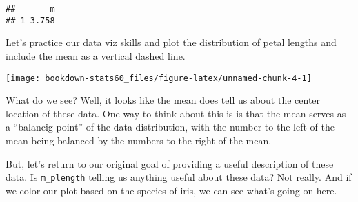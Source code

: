 \documentclass[]{book}
\newenvironment{Shaded}{\begin{snugshade}}{\end{snugshade}}
\newcommand{\KeywordTok}[1]{\textcolor[rgb]{0.13,0.29,0.53}{\textbf{{#1}}}}
\newcommand{\DataTypeTok}[1]{\textcolor[rgb]{0.13,0.29,0.53}{{#1}}}
\newcommand{\DecValTok}[1]{\textcolor[rgb]{0.00,0.00,0.81}{{#1}}}
\newcommand{\FloatTok}[1]{\textcolor[rgb]{0.00,0.00,0.81}{{#1}}}
\newcommand{\StringTok}[1]{\textcolor[rgb]{0.31,0.60,0.02}{{#1}}}
\newcommand{\NormalTok}[1]{{#1}}
\begin{document}
\begin{Shaded}
\end{Shaded}

\begin{verbatim}
##       m
## 1 3.758
\end{verbatim}

Let's practice our data viz skills and plot the distribution of petal
lengths and include the mean as a vertical dashed line.

\begin{Shaded}
\end{Shaded}

\begin{center}\texttt{[image: bookdown-stats60\_files/figure-latex/unnamed-chunk-4-1]} \end{center}

What do we see? Well, it looks like the mean does tell us about the
center location of these data. One way to think about this is is that
the mean serves as a ``balancig point'' of the data distribution, with
the number to the left of the mean being balanced by the numbers to the
right of the mean.

But, let's return to our original goal of providing a useful description
of these data. Is \texttt{m\_plength} telling us anything useful about
these data? Not really. And if we color our plot based on the species of
iris, we can see what's going on here.
\end{document}
